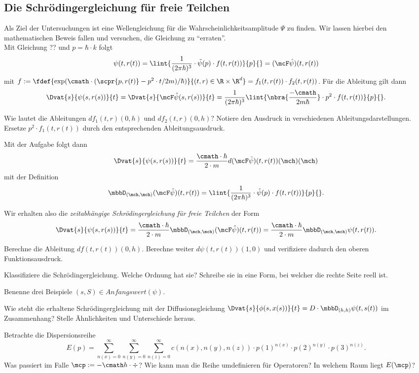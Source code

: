 \documentclass{subfiles}
\begin{document}
    \subsection{Die Schrödingergleichung für freie Teilchen}
    Als Ziel der Untersuchungen ist eine Wellengleichung für die Wahrscheinlichkeitsamplitude $\Psi$ zu finden. Wir lassen hierbei den mathematischen Beweis fallen und versuchen, die Gleichung zu \enquote{erraten}.\\
    Mit Gleichung ?? und $p = \hbar\cdot k$ folgt 
    \[\psi(t,r(t)) = \lint{\frac{1}{(2\pi\hbar)^3}\cdot\tilde\psi(p)\cdot f(t,r(t))}{p}{} = (\mcF \hat\psi)(t,r(t))\]
    mit $f:=\fdef{\exp(\cmath\cdot(\scpr{p,r(t)}-p^2\cdot t/2m)/\hbar)}{(t,r)\in\R\times\R^d} = f_1(t,r(t))\cdot f_2(t,r(t))$. Für die Ableitung gilt dann
    \[\Dvat{s}{\psi(s,r(s))}{t} = \Dvat{s}{\mcF\hat\psi(s,r(s))}{t} = \frac{1}{(2\pi\hbar)^3}\lint{\nbra{\frac{-\cmath}{2m\hbar}}\cdot p^2\cdot f(t,r(t))}{p}{}.\]
    \begin{Aufgabe}
        \nr{} Wie lautet die Ableitungen $df_1(t,r)(0,h)$ und $df_2(t,r)(0,h)$? Notiere den Ausdruck in verschiedenen Ableitungsdarstellungen. Ersetze $p^2\cdot f_1(t,r(t))$ durch den entsprechenden Ableitungsausdruck. 
    \end{Aufgabe}
    \noindent Mit der Aufgabe folgt dann 
    \[\Dvat{s}{\psi(s,r(s))}{t} = \frac{\cmath\cdot\hbar}{2\cdot m} d(\mcF\tilde\psi)(t,r(t))(\mch)(\mch)\]
    mit der Definition 
    \[\mbbD_{(\mch,\mch)}(\mcF\hat\psi)(t,r(t)) = \lint{\frac{1}{(2\pi\hbar)^3}\cdot\hat\psi(p)\cdot f(t,r(t))}{p}{}.\]
    \begin{whiteframedr}
        Wir erhalten also die \emph{zeitabhängige Schrödingergleichung für freie Teilchen} der Form
        \[\Dvat{s}{\psi(s,r(s))}{t} = \frac{\cmath\cdot\hbar}{2\cdot m} \mbbD_{(\mch,\mch)}(\mcF\hat\psi)(t,r(t)) = \frac{\cmath\cdot\hbar}{2\cdot m} \mbbD_{(\mch,\mch)}\psi(t,r(t)).\]
    \end{whiteframedr}

    \begin{Aufgabe}
        \nr{} Berechne die Ableitung $df(t,r(t))(0,h)$. Berechne weiter $d\psi(t,r(t))(1,0)$ und verifiziere dadurch den oberen Funktionsausdruck.

        \nr{} Klassifiziere die Schrödingergleichung. Welche Ordnung hat sie? Schreibe sie in eine Form, bei welcher die rechte Seite reell ist. 

        \nr{} Benenne drei Beispiele $(s,S)\in\textit{Anfangswert}(\psi)$. 

        \nr{} Wie steht die erhaltene Schrödingergleichung mit der Diffusionsgleichung $\Dvat{s}{\phi(s,x(s))}{t} = D\cdot \mbbD_{(h,h)}\psi(t,s(t))$ im Zusammenhang? Stelle Ähnlichkeiten und Unterschiede heraus. 

        \nr{} Betrachte die Dispersionsreihe 
        \[E(p) = \sum_{n(x) = 0}^\infty\sum_{n(y) = 0}^\infty\sum_{n(z) = 0}^\infty c(n(x),n(y),n(z))\cdot p(1)^{n(x)}\cdot p(2)^{n(y)}\cdot p(3)^{n(z)}.\]
        Was passiert im Falle $\mcp := -\cmath h\cdot\div$? Wie kann man die Reihe umdefinieren für Operatoren? In welchem Raum liegt $E(\mcp)$?
    \end{Aufgabe}
\end{document}
